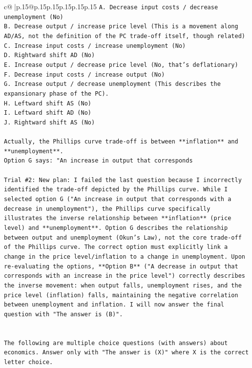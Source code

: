 \documentclass{article}
\begin{document}
{\begin{supertabular}{c@{$\;$}|p{.15\linewidth}@{}p{.15\linewidth}p{.15\linewidth}p{.15\linewidth}p{.15\linewidth}p{.15\linewidth}}
{{{\texttt{A. Decrease input costs / decrease unemployment (No)} \\
\texttt{B. Decrease output / increase price level (This is a movement along AD/AS, not the definition of the PC trade{-}off itself, though related)} \\
\texttt{C. Increase input costs / increase unemployment (No)} \\
\texttt{D. Rightward shift AD (No)} \\
\texttt{E. Increase output / decrease price level (No, that's deflationary)} \\
\texttt{F. Decrease input costs / increase output (No)} \\
\texttt{G. Increase output / decrease unemployment (This describes the expansionary phase of the PC).} \\
\texttt{H. Leftward shift AS (No)} \\
\texttt{I. Leftward shift AD (No)} \\
\texttt{J. Rightward shift AS (No)} \\
\\ 
\texttt{Actually, the Phillips curve trade{-}off is between **inflation** and **unemployment**.} \\
\texttt{Option G says: "An increase in output that corresponds} \\
\\ 
\texttt{Trial \#2: New plan: I failed the last question because I incorrectly identified the trade{-}off depicted by the Phillips curve. While I selected option G ("An increase in output that corresponds with a decrease in unemployment"), the Phillips curve specifically illustrates the inverse relationship between **inflation** (price level) and **unemployment**. Option G describes the relationship between output and unemployment (Okun's Law), not the core trade{-}off of the Phillips curve. The correct option must explicitly link a change in the price level/inflation to a change in unemployment. Upon re{-}evaluating the options, **Option B** ("A decrease in output that corresponds with an increase in the price level") correctly describes the inverse movement: when output falls, unemployment rises, and the price level (inflation) falls, maintaining the negative correlation between unemployment and inflation. I will now answer the final question with "The answer is (B)".} \\
\\ 
\\ 
\texttt{The following are multiple choice questions (with answers) about economics. Answer only with "The answer is (X)" where X is the correct letter choice.} \\
}}}
\end{supertabular}}
\end{document}
